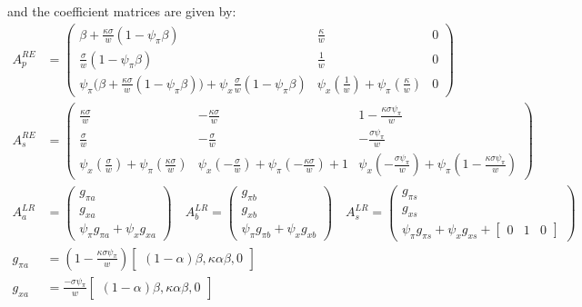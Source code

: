 \documentclass[11pt]{article}
\renewcommand{\[}{\begin{equation}}
\renewcommand{\]}{\end{equation}}
\begin{document}
and the coefficient matrices are given by:
\begin{align}
A_p^{RE} & = \begin{pmatrix} \beta + \frac{\kappa\sigma}{w} (1-\psi_{\pi}\beta) & \frac{\kappa}{w} & 0\\
 \frac{\sigma}{w} (1-\psi_{\pi}\beta) & \frac{1}{w}& 0\\ 
\psi_{\pi}\big( \beta + \frac{\kappa\sigma}{w} (1-\psi_{\pi}\beta) \big) +\psi_x\frac{\sigma}{w} (1-\psi_{\pi}\beta)&  \psi_x (\frac{1}{w})+ \psi_{\pi} (\frac{\kappa}{w})& 0\end{pmatrix} \quad \\
A_s^{RE} &= \begin{pmatrix}   \frac{\kappa\sigma}{w}  &-\frac{\kappa\sigma}{w}  & 1-\frac{\kappa\sigma\psi_{\pi}}{w}\\
 \frac{ \sigma}{w} &  -\frac{\sigma}{w} & -\frac{\sigma\psi_{\pi}}{w}\\ 
 \psi_x( \frac{\sigma}{w}) + \psi_{\pi}( \frac{\kappa\sigma}{w}) & \psi_x(- \frac{\sigma}{w}) + \psi_{\pi}(- \frac{\kappa\sigma}{w}) +1 &  \psi_x(-\frac{\sigma\psi_{\pi}}{w}) + \psi_{\pi}( 1-\frac{\kappa\sigma\psi_{\pi}}{w})\end{pmatrix}  
\\
A_a^{LR} & = \begin{pmatrix} g_{\pi a} \\ g_{x a} \\ \psi_{\pi}g_{\pi a} + \psi_xg_{x a}
\end{pmatrix}
\quad A_b^{LR} = \begin{pmatrix} g_{\pi b} \\ g_{x b} \\ \psi_{\pi}g_{\pi b} + \psi_xg_{x b}
\end{pmatrix}
 \quad A_s^{LR} = \begin{pmatrix} g_{\pi s} \\ g_{x s} \\ \psi_{\pi}g_{\pi s} + \psi_xg_{x s} + \begin{bmatrix} 0 & 1& 0\end{bmatrix}
\end{pmatrix} \\
g_{\pi a} & =(1-\frac{\kappa\sigma\psi_{\pi}}{w} )  \begin{bmatrix}(1-\alpha)\beta, \kappa\alpha\beta, 0 \end{bmatrix} \\
g_{x a} & =  \frac{-\sigma\psi_{\pi}}{w} \begin{bmatrix}(1-\alpha)\beta, \kappa\alpha\beta, 0 \end{bmatrix}\\

\end{align}
\end{document}
